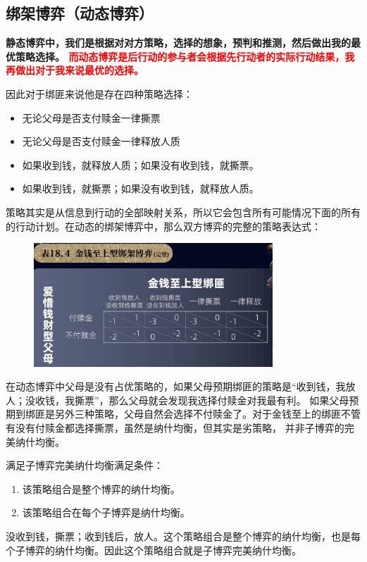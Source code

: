 \documentclass[12pt, a4paper]{article}
\begin{document}
\begin{CJK*}{UTF8}{gbsn}
        \subsection{绑架博弈（动态博弈）}
        \textbf{静态博弈中，我们是根据对对方策略，选择的想象，预判和推测，然后做出我的最优策略选择。
        \textcolor{red}{而动态博弈是后行动的参与者会根据先行动者的实际行动结果，我再做出对于我来说最优的选择。}} \par
        因此对于绑匪来说他是存在四种策略选择：
        \begin{itemize}
            \item 无论父母是否支付赎金一律撕票
            \item 无论父母是否支付赎金一律释放人质
            \item 如果收到钱，就释放人质；如果没有收到钱，就撕票。
            \item 如果收到钱，就撕票；如果没有收到钱，就释放人质。
        \end{itemize}
        策略其实是从信息到行动的全部映射关系，所以它会包含所有可能情况下面的所有的行动计划。在动态的绑架博弈中，那么双方博弈的完整的策略表达式：

        \begin{figure}[htbp]
            \centering
            \includegraphics[width=0.8\textwidth]{./figures/catch2023-08-02-15.29.21.png}
        \end{figure}

        在动态博弈中父母是没有占优策略的，如果父母预期绑匪的策略是“收到钱，我放人；没收钱，我撕票”，那么父母就会发现我选择付赎金对我最有利。
        如果父母预期到绑匪是另外三种策略，父母自然会选择不付赎金了。对于金钱至上的绑匪不管有没有付赎金都选择撕票，虽然是纳什均衡，但其实是劣策略，
        并非子博弈的完美纳什均衡。\par
        满足子博弈完美纳什均衡满足条件：
        \begin{enumerate}
            \item 该策略组合是整个博弈的纳什均衡。
            \item 该策略组合在每个子博弈是纳什均衡。
        \end{enumerate}
        没收到钱，撕票；收到钱后，放人。这个策略组合是整个博弈的纳什均衡，也是每个子博弈的纳什均衡。因此这个策略组合就是子博弈完美纳什均衡。

\end{CJK*}
\end{document}
